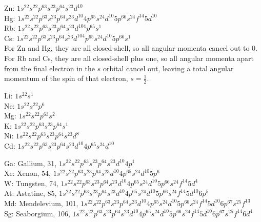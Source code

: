 \documentclass[answers]{exam}
\begin{document}
\begin{questions}
\begin{solution}
	Zn: $1s^22s^22p^63s^23p^64s^23d^{10}$ \\
	Hg: $1s^22s^22p^63s^23p^64s^23d^{10}4p^65s^24d^{10}5p^66s^24f^{14}5d^{10}$ \\
	Rb: $1s^22s^22p^63s^23p^64s^23d^104p^65s^1$ \\
	Cs: $1s^22s^22p^63s^23p^64s^23d^104p^65s^24d^{10}5p^66s^1$ \\
	For Zn and Hg, they are all closed-shell, so all angular momenta cancel out to 0. For Rb and Cs, they are all closed-shell plus one, so all angular momenta apart from the final electron in the $s$ orbital cancel out, leaving a total angular momentum of the spin of that electron, $s=\frac{1}{2}$.
\end{solution}


\begin{solution}
	Li: $1s^22s^1$ \\
	Ne: $1s^22s^22p^6$ \\
	Mg: $1s^22s^22p^63s^2$ \\
	K: $1s^22s^22p^63s^23p^64s^1$ \\
	Ni: $1s^22s^22p^63s^23p^64s^23d^8$ \\
	Cd: $1s^22s^22p^63s^23p^64s^23d^{10}4p^65s^24d^{10}$
\end{solution}


\begin{solution}
	Ga: Gallium, 31, $1s^22s^22p^63s^23p^64s^23d^{10}4p^1$ \\
	Xe: Xenon, 54, $1s^22s^22p^63s^23p^64s^23d^{10}4p^65s^24d^{10}5p^6$ \\
	W: Tungsten, 74, $1s^22s^22p^63s^23p^64s^23d^{10}4p^65s^24d^{10}5p^66s^24f^{14}5d^4$ \\
	At: Astatine, 85, $1s^22s^22p^63s^23p^64s^23d^{10}4p^65s^24d^{10}5p^66s^24f^{14}5d^{10}6p^5$ \\
	Md: Mendelevium, 101, $1s^22s^22p^63s^23p^64s^23d^{10}4p^65s^24d^{10}5p^66s^24f^{14}5d^{10}6p^67s^25f^{13}$ \\
	Sg: Seaborgium, 106, $1s^22s^22p^63s^23p^64s^23d^{10}4p^65s^24d^{10}5p^66s^24f^{14}5d^{10}6p^67s^25f^{14}6d^4$
\end{solution}

\end{questions}
\end{document}
